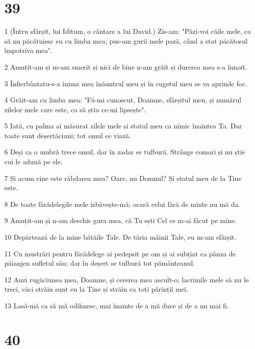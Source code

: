 \chapter{39}

\par 1 (Întru sfârșit, lui Iditum, o cântare a lui David.) Zis-am: "Păzi-voi căile mele, ca să nu păcătuiesc eu cu limba mea; pus-am gurii mele pază, când a stat păcătosul împotriva mea".
\par 2 Amuțit-am și m-am smerit și nici de bine n-am grăit și durerea mea s-a înnoit.
\par 3 Înfierbântatu-s-a inima mea înăuntrul meu și în cugetul meu se va aprinde foc.
\par 4 Grăit-am cu limba mea: "Fă-mi cunoscut, Doamne, sfârșitul meu, și numărul zilelor mele care este, ca să știu ce-mi lipsește".
\par 5 Iată, cu palma ai măsurat zilele mele și statul meu ca nimic înaintea Ta. Dar toate sunt deșertăciuni; tot omul ce viază.
\par 6 Deși ca o umbră trece omul, dar în zadar se tulbură. Strânge comori și nu știe cui le adună pe ele.
\par 7 Și acum cine este răbdarea mea? Oare, nu Domnul? Și statul meu de la Tine este.
\par 8 De toate fărădelegile mele izbăvește-mă; ocară celui fără de minte nu mă da.
\par 9 Amuțit-am și n-am deschis gura mea, că Tu ești Cel ce m-ai făcut pe mine.
\par 10 Depărtează de la mine bătăile Tale. De tăria mâinii Tale, eu m-am sfârșit.
\par 11 Cu mustrări pentru fărădelege ai pedepsit pe om și ai subțiat ca pânza de păianjen sufletul său; dar în deșert se tulbură tot pământeanul.
\par 12 Auzi rugăciunea mea, Doamne, și cererea mea ascult-o; lacrimile mele să nu le treci, căci străin sunt eu la Tine și străin ca toți părinții mei.
\par 13 Lasă-mă ca să mă odihnesc, mai înainte de a mă duce și de a nu mai fi.

\chapter{40}

